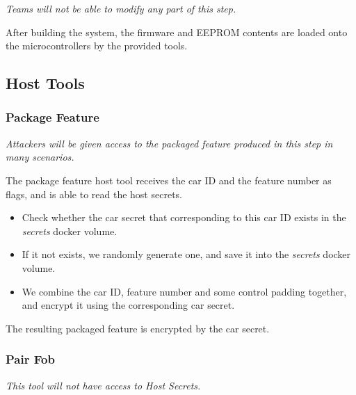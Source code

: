 \documentclass[11pt,oneside,onecolumn,letterpaper]{article}
\begin{document}
\textit{Teams will not be able to modify any part of this step.}

After building the system, the firmware and EEPROM contents are loaded onto the microcontrollers by the provided tools.

\subsection{Host Tools}

\subsubsection{Package Feature}

\textit{Attackers will be given access to the packaged feature produced in this step in many scenarios.}

The package feature host tool receives the car ID and the feature number as flags, and is able to read the host secrets.
\begin{itemize}
	\item Check whether the car secret that corresponding to this car ID exists in the \textit{secrets} docker volume.
	\item If it not exists, we randomly generate one, and save it into the \textit{secrets} docker volume.
	\item We combine the car ID, feature number and some control padding together, and encrypt it using the corresponding car secret.
\end{itemize}

The resulting packaged feature is encrypted by the car secret.

\subsubsection{Pair Fob}

\textit{This tool will not have access to Host Secrets.}
\end{document}
